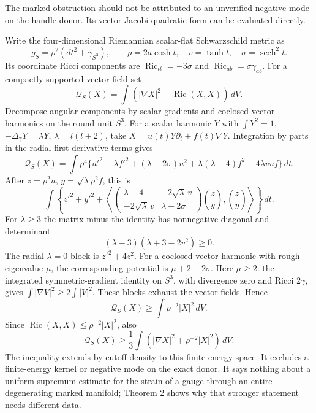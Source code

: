 \documentclass[
  11pt,
]{article}
\begin{document}
The marked obstruction should not be attributed to an unverified
negative mode on the handle donor. Its vector Jacobi quadratic form can
be evaluated directly.

Write the four-dimensional Riemannian scalar-flat Schwarzschild metric
as \[
 g_S=\rho^2(dt^2+\gamma_{S^3}),\qquad
 \rho=2a\cosh t,\quad v=\tanh t,\quad \sigma=\operatorname{sech}^2t .
\] Its coordinate Ricci components are
\(\operatorname{Ric}_{tt}=-3\sigma\) and
\(\operatorname{Ric}_{ab}=\sigma\gamma_{ab}\). For a compactly supported
vector field set \[
 \mathcal Q_S(X)=\int
       (|\nabla X|^2-\operatorname{Ric}(X,X))\,dV .
\] Decompose angular components by scalar gradients and coclosed vector
harmonics on the round unit \(S^3\). For a scalar harmonic \(Y\) with
\(\int Y^2=1\), \(-\Delta_\gamma Y=\lambda Y\), \(\lambda=l(l+2)\), take
\(X=u(t)Y\partial_t+f(t)\nabla Y\). Integration by parts in the radial
first-derivative terms gives \[
 \mathcal Q_S(X)=\int\rho^4\{
 u'^2+\lambda f'^2+(\lambda+2\sigma)u^2
       +\lambda(\lambda-4)f^2-4\lambda vuf\}\,dt .
\] After \(z=\rho^2u\), \(y=\sqrt{\lambda}\rho^2f\), this is \[
 \int\left\{z'^2+y'^2+
 \left\langle
 \begin{pmatrix}
 \lambda+4&-2\sqrt{\lambda}\,v\\
 -2\sqrt{\lambda}\,v&\lambda-2\sigma
 \end{pmatrix}
 \binom zy,\binom zy\right\rangle\right\}\,dt .          \tag{A.1}
\] For \(\lambda\ge3\) the matrix minus the identity has nonnegative
diagonal and determinant \[
       (\lambda-3)(\lambda+3-2v^2)\ge0 .
\] The radial \(\lambda=0\) block is \(z'^2+4z^2\). For a coclosed
vector harmonic with rough eigenvalue \(\mu\), the corresponding
potential is \(\mu+2-2\sigma\). Here \(\mu\ge2\): the integrated
symmetric-gradient identity on \(S^3\), with divergence zero and Ricci
\(2\gamma\), gives \(\int|\nabla V|^2\ge2\int|V|^2\). These blocks
exhaust the vector fields. Hence \[
 \mathcal Q_S(X)\ge\int\rho^{-2}|X|^2\,dV .             \tag{A.2}
\] Since \(\operatorname{Ric}(X,X)\le\rho^{-2}|X|^2\), also \[
 \mathcal Q_S(X)\ge\frac13
       \int(|\nabla X|^2+\rho^{-2}|X|^2)\,dV .         \tag{A.3}
\] The inequality extends by cutoff density to this finite-energy space.
It excludes a finite-energy kernel or negative mode on the exact donor.
It says nothing about a uniform supremum estimate for the strain of a
gauge through an entire degenerating marked manifold; Theorem 2 shows
why that stronger statement needs different data.
\end{document}
